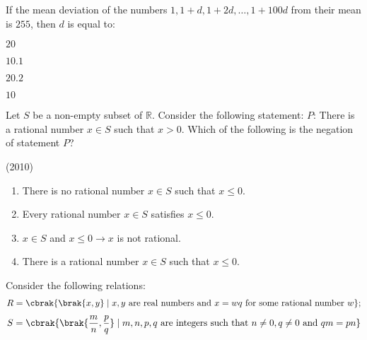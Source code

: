 \iffalse
\title{Assignment 2}
\author{EE24Btech11024 - G. Abhimanyu Koushik}
\section{mcq-single}
\fi
    \item If the mean deviation of the numbers $1, 1+d, 1+2d, \dots, 1+100d$ from their mean is $255$, then $d$ is equal to:
    
    \hfill{}
    \begin{enumerate}
    \begin{multicols}{4}
        \item $20$
        \item $10.1$
        \item $20.2$
        \item $10$
    \end{multicols}
    \end{enumerate}
    
    \item Let $S$ be a non-empty subset of $\mathbb{R}$. Consider the following statement:\newline
    $P$: There is a rational number $x \in S$ such that $x>0$.\newline
    Which of the following is the negation of statement $P$?
    
    \hfill{(2010)}
    \begin{enumerate}
    \item There is no rational number $x \in S$ such that $x \leq 0$.
    \item Every rational number $x \in S$ satisfies $x \leq 0$.
    \item $x \in S$ and $x \leq 0 \longrightarrow x$ is not rational.
    \item There is a rational number $x \in S$ such that $x \leq 0$.
    \end{enumerate}
    
    \item Consider the following relations: \newline
    \begin{align*}
    R = \cbrak{\brak{x, y} \mid x,y \text{ are real numbers and } x = wq \text{ for some rational number } w}; 
    \end{align*}
    \begin{align*}
    S = \cbrak{\brak{\frac{m}{n}, \frac{p}{q}} \mid m, n, p, q \text{ are integers such that } n \neq 0, q \neq 0 \text{ and } qm = pn}
    \end{align*}
    
